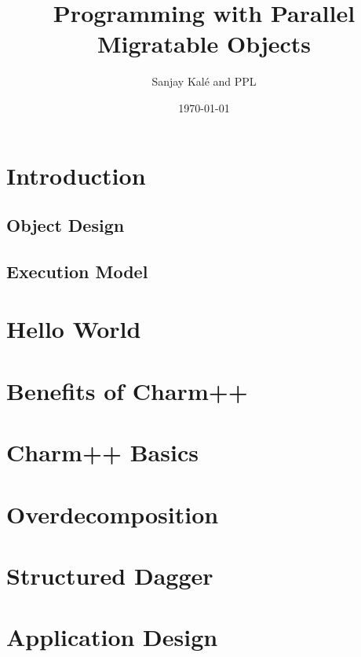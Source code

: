 \documentclass{beamer}
\title[Parallel Migratable Objects]{Programming with Parallel Migratable Objects}
\institute[UIUC]{Parallel Programming Laboratory \\University of Illinois Urbana-Champaign}
\author{Sanjay Kal\'e and PPL}
\date{\today}
\begin{document}
\frame{\titlepage}

\section[Concepts]{Introduction}

\subsection[Object Design]{Object Design}


\subsection[Execution Mode]{Execution Model}

\section[Hello World]{Hello World}


\section[Benefits]{Benefits of Charm++}

\section[Charm++]{Charm++ Basics}


\section[Overdecomposition]{Overdecomposition}

\section[Charm++]{Structured Dagger}


\section[Application Design]{Application Design}

\end{document}
